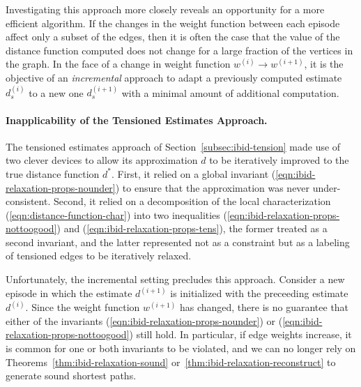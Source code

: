 Investigating this approach more closely reveals an opportunity for
a more efficient algorithm.
If the changes in the weight function between each episode affect
only a subset of the edges,
then it is often the case that the value of the distance function
computed does not change for a large fraction of the vertices in the
graph.
In the face of a change in weight function
$w^{(i)} \rightarrow w^{(i+1)}$,
it is the objective of an \emph{incremental} approach
to adapt a previously computed estimate $d_s^{(i)}$
to a new one $d_s^{(i+1)}$ with a minimal amount of additional
computation.

\paragraph{Inapplicability of the Tensioned Estimates Approach.}
The tensioned estimates approach of Section~\ref{subsec:ibid-tension}
made use of two clever devices to allow its approximation $d$ to be
iteratively improved to the true distance function $d^*$.
First, it relied on a global invariant
(\ref{eqn:ibid-relaxation-props-nounder})
to ensure that the approximation was never under-consistent.
Second, it relied on a decomposition of the local characterization
(\ref{eqn:distance-function-char})
into two inequalities
(\ref{eqn:ibid-relaxation-props-nottoogood})
and (\ref{eqn:ibid-relaxation-props-tens}),
the former treated as a second invariant,
and the latter represented not as a constraint but as a labeling
of tensioned edges to be iteratively relaxed.

Unfortunately,
the incremental setting precludes this approach.
Consider a new episode in which the estimate $d^{(i+1)}$
is initialized with the preceeding estimate $d^{(i)}$.
Since the weight function $w^{(i+1)}$ has changed,
there is no guarantee that either of the invariants
(\ref{eqn:ibid-relaxation-props-nounder})
or (\ref{eqn:ibid-relaxation-props-nottoogood}) still hold.
In particular,
if edge weights increase,
it is common for one or both invariants to be violated,
and we can no longer rely on Theorems~\ref{thm:ibid-relaxation-sound}
or~\ref{thm:ibid-relaxation-reconstruct} to generate sound
shortest paths.


